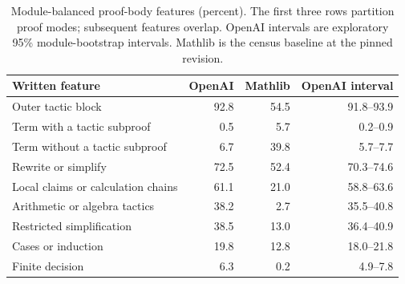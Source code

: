 \begin{table}[H]
\centering
\caption{Module-balanced proof-body features (percent). The first three rows partition proof modes; subsequent features overlap. OpenAI intervals are exploratory 95\% module-bootstrap intervals. Mathlib is the census baseline at the pinned revision.}
\label{tab:profile}
\small
\setlength{\tabcolsep}{5pt}
\renewcommand{\arraystretch}{1.18}
\begin{tabular}{@{}p{6.7cm}rrr@{}}
\toprule
Written feature & OpenAI & Mathlib & OpenAI interval \\
\midrule
Outer tactic block & 92.8 & 54.5 & 91.8--93.9 \\[4pt]
Term with a tactic subproof & 0.5 & 5.7 & 0.2--0.9 \\[4pt]
Term without a tactic subproof & 6.7 & 39.8 & 5.7--7.7 \\[4pt]
\midrule
Rewrite or simplify & 72.5 & 52.4 & 70.3--74.6 \\[4pt]
Local claims or calculation chains & 61.1 & 21.0 & 58.8--63.6 \\[4pt]
Arithmetic or algebra tactics & 38.2 & 2.7 & 35.5--40.8 \\[4pt]
Restricted simplification & 38.5 & 13.0 & 36.4--40.9 \\[4pt]
Cases or induction & 19.8 & 12.8 & 18.0--21.8 \\[4pt]
Finite decision & 6.3 & 0.2 & 4.9--7.8 \\[4pt]
\bottomrule
\end{tabular}
\end{table}
